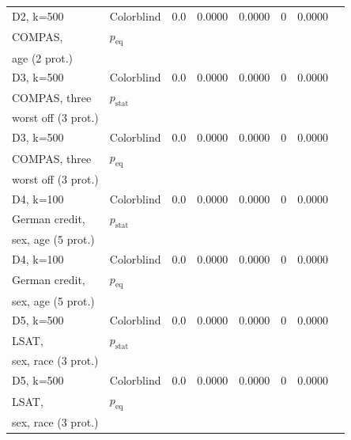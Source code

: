 \begin{table}[t]
{\begin{tabular}{llcccccc}
			D2, k=500 & Colorblind & 0.0 & 0.0000 & 0.0000 & 0 & 0.0000 \\
			COMPAS, & \algoFAIR $p_{\text{eq}}$ &  & \textbf{} & \textbf{} & \textbf{} & \textbf{} \\
			age (2 prot.) &  &  &  &  &  &  \\ \midrule
			\midrule
			
			D3, k=500 & Colorblind & 0.0 & 0.0000 & 0.0000 & 0 & 0.0000 \\
			COMPAS, three & \algoFAIR  $p_{\text{stat}}$ &  & \textbf{} & \textbf{} & \textbf{} & \textbf{} \\
			worst off (3 prot.) & \citeauthor{zehlike2020matching} &  &  &  &  &  \\ \midrule
			
			D3, k=500 & Colorblind & 0.0 & 0.0000 & 0.0000 & 0 & 0.0000 \\
			COMPAS, three & \algoFAIR  $p_{\text{eq}}$ &  & \textbf{} & \textbf{} & \textbf{} & \textbf{} \\
			worst off (3 prot.) &  &  &  &  &  &  \\ \midrule
			\midrule
			
			D4, k=100  & Colorblind & 0.0 & 0.0000 & 0.0000 & 0 & 0.0000 \\
			German credit, & \algoFAIR $p_{\text{stat}}$ &  & \textbf{} & \textbf{} & \textbf{} & \textbf{} \\
			sex, age (5 prot.) & \citeauthor{zehlike2020matching} &  &  &  &  &  \\ \midrule
			
			D4, k=100  & Colorblind & 0.0 & 0.0000 & 0.0000 & 0 & 0.0000 \\
			German credit, & \algoFAIR $p_{\text{eq}}$ &  & \textbf{} & \textbf{} & \textbf{} & \textbf{} \\
			sex, age (5 prot.) &  &  &  &  &  &  \\ \midrule
			\midrule
			
			D5, k=500  & Colorblind & 0.0 & 0.0000 & 0.0000 & 0 & 0.0000 \\
			LSAT,& \algoFAIR $p_{\text{stat}}$ &  & \textbf{} & \textbf{} & \textbf{} & \textbf{} \\
			sex, race (3 prot.) & \citeauthor{zehlike2020matching} &  &  &  &  & \textbf{} \\ \midrule
			
			D5, k=500  & Colorblind & 0.0 & 0.0000 & 0.0000 & 0 & 0.0000 \\
			LSAT,& \algoFAIR $p_{\text{eq}}$ &  & \textbf{} & \textbf{} & \textbf{} & \textbf{} \\
			sex, race (3 prot.) &  &  &  &  &  & \textbf{} \\			
			\bottomrule
		\end{tabular}
	}
	\vspace{-3mm}
\end{table}
